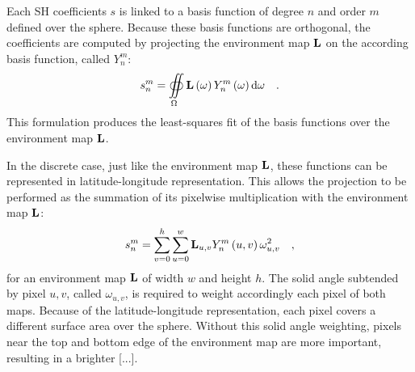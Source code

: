 \documentclass{report}
\begin{document}
Each SH coefficients $s$ is linked to a basis function of degree $n$ and order $m$ defined over the sphere. Because these basis functions are orthogonal, the coefficients are computed by projecting the environment map $\mathbf{L}$ on the according basis function, called $Y_n^m$:
\begin{equation}
s_n^m = \oiint\limits_{\Omega} \mathbf{L}\left(\mathbf{\omega} \right) Y_n^m \left( \mathbf{\omega} \right) \mathrm{d} \mathbf{\omega}   \quad.
\end{equation}
This formulation produces the least-squares fit of the basis functions over the environment map $\mathbf{L}$.

In the discrete case, just like the environment map $\mathbf{L}$, these functions can be represented in latitude-longitude representation. This allows the projection to be performed as the summation of its pixelwise multiplication with the environment map $\mathbf{L}$:
\begin{equation}
s_n^m = \sum_{v=0}^{h} \sum_{u=0}^{w} \mathbf{L}_{u,v} Y_n^m\left(u, v\right) \omega_{u,v}^2 \quad,
\end{equation}
for an environment map $\mathbf{L}$ of width $w$ and height $h$. The solid angle subtended by pixel $u,v$, called $\omega_{u,v}$, is required to weight accordingly each pixel of both maps. Because of the latitude-longitude representation, each pixel covers a different surface area over the sphere. Without this solid angle weighting, pixels near the top and bottom edge of the environment map are more important, resulting in a brighter  [...].
\end{document}
